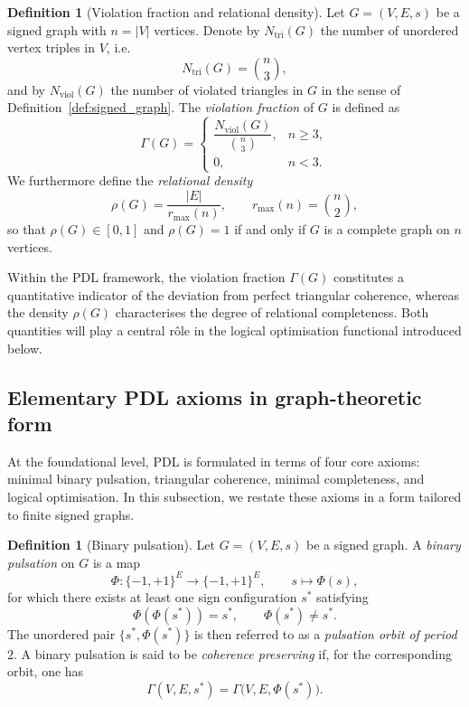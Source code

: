 \documentclass[11pt,a4paper]{article}
\theoremstyle{definition}
\newtheorem{definition}[theorem]{Definition}
\begin{document}
\begin{definition}[Violation fraction and relational density]
\label{def:gamma_rho}
Let $G=(V,E,s)$ be a signed graph with $n = |V|$ vertices. Denote by $N_{\mathrm{tri}}(G)$ the number of unordered vertex triples in $V$, i.e.
\[
 N_{\mathrm{tri}}(G) = \binom{n}{3},
\]
and by $N_{\mathrm{viol}}(G)$ the number of violated triangles in $G$ in the sense of Definition~\ref{def:signed_graph}. The \emph{violation fraction} of $G$ is defined as
\[
 \Gamma(G) =
 \begin{cases}
  \dfrac{N_{\mathrm{viol}}(G)}{\binom{n}{3}}, & n \geq 3,\\[6pt]
  0, & n < 3.
 \end{cases}
\]
We furthermore define the \emph{relational density}
\[
 \rho(G) = \frac{|E|}{r_{\max}(n)}, \qquad
 r_{\max}(n) = \binom{n}{2},
\]
so that $\rho(G) \in [0,1]$ and $\rho(G)=1$ if and only if $G$ is a complete graph on $n$ vertices.
\end{definition}

Within the PDL framework, the violation fraction $\Gamma(G)$ constitutes a quantitative indicator of the deviation from perfect triangular coherence, whereas the density $\rho(G)$ characterises the degree of relational completeness.\cite{PDL_Intro_2026,PDL_Main_2026} Both quantities will play a central rôle in the logical optimisation functional introduced below.

\subsection{Elementary PDL axioms in graph-theoretic form}

At the foundational level, PDL is formulated in terms of four core axioms: minimal binary pulsation, triangular coherence, minimal completeness, and logical optimisation.\cite{PDL_Intro_2026,PDL_Main_2026,PDL_TO_Dialogue_2026} In this subsection, we restate these axioms in a form tailored to finite signed graphs.

\begin{definition}[Binary pulsation]
\label{def:binary_pulsation}
Let $G=(V,E,s)$ be a signed graph. A \emph{binary pulsation} on $G$ is a map
\[
 \Phi : \{-1,+1\}^{E} \to \{-1,+1\}^{E}, \qquad s \mapsto \Phi(s),
\]
for which there exists at least one sign configuration $s^\ast$ satisfying
\begin{equation}
 \Phi(\Phi(s^\ast)) = s^\ast, 
 \qquad \Phi(s^\ast) \neq s^\ast.
 \label{eq:binary_pulsation_orbit}
\end{equation}
The unordered pair $\{s^\ast,\Phi(s^\ast)\}$ is then referred to as a \emph{pulsation orbit of period $2$}. A binary pulsation is said to be \emph{coherence preserving} if, for the corresponding orbit, one has
\[
 \Gamma(V,E,s^\ast) = \Gamma\bigl(V,E,\Phi(s^\ast)\bigr).
\]
\end{definition}
\end{document}
